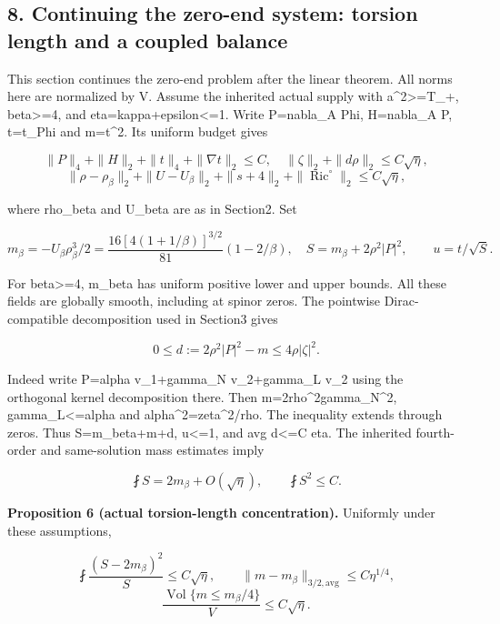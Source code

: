\documentclass[
  10pt,
]{article}
\begin{document}
\hypertarget{continuing-the-zero-end-system-torsion-length-and-a-coupled-balance}{%
\subsection{8. Continuing the zero-end system: torsion length and a
coupled
balance}\label{continuing-the-zero-end-system-torsion-length-and-a-coupled-balance}}

This section continues the zero-end problem after the linear theorem.
All norms here are normalized by V. Assume the inherited actual supply
with a\^{}2\textgreater=T\_+, beta\textgreater=4, and
eta=kappa+epsilon\textless=1. Write P=nabla\_A Phi, H=nabla\_A P,
t=t\_Phi and m=\textbar t\textbar\^{}2. Its uniform budget gives

\[
 \|P\|_4+\|H\|_2+\|t\|_4+\|\nabla t\|_2\le C,\quad
 \|\zeta\|_2+\|d\rho\|_2\le C\sqrt\eta,
\] \[
 \|\rho-\rho_\beta\|_2+\|U-U_\beta\|_2
 +\|s+4\|_2+\|\operatorname{Ric}^{\circ}\|_2\le C\sqrt\eta,
\]

where rho\_beta and U\_beta are as in Section2. Set

\[
 m_\beta=-U_\beta\rho_\beta^3/2
 =\frac{16[4(1+1/\beta)]^{3/2}}{81}(1-2/\beta),\quad
 S=m_\beta+2\rho^2|P|^2,\qquad u=t/\sqrt S.            \tag{8.1}
\]

For beta\textgreater=4, m\_beta has uniform positive lower and upper
bounds. All these fields are globally smooth, including at spinor zeros.
The pointwise Dirac-compatible decomposition used in Section3 gives

\[
       0\le d:=2\rho^2|P|^2-m\le4\rho|\zeta|^2.      \tag{8.2}
\]

Indeed write P=alpha v\_1+gamma\_N v\_2+gamma\_L v\_2 using the
orthogonal kernel decomposition there. Then
m=2rho\^{}2\textbar gamma\_N\textbar\^{}2,
\textbar gamma\_L\textbar\textless=\textbar alpha\textbar{} and
\textbar alpha\textbar\^{}2=\textbar zeta\textbar\^{}2/rho. The
inequality extends through zeros. Thus S=m\_beta+m+d,
\textbar u\textbar\textless=1, and avg d\textless=C eta. The inherited
fourth-order and same-solution mass estimates imply

\[
 \fint S=2m_\beta+O(\sqrt\eta),\qquad \fint S^2\le C. \tag{8.3}
\]

\textbf{Proposition 6 (actual torsion-length concentration).} Uniformly
under these assumptions,

\[
 \fint\frac{(S-2m_\beta)^2}{S}\le C\sqrt\eta,\qquad
 \|m-m_\beta\|_{3/2,\mathrm{avg}}\le C\eta^{1/4},
                                                               \tag{8.4}
\] \[
 \frac{\operatorname{Vol}\{m\le m_\beta/4\}}V
                                      \le C\sqrt\eta. \tag{8.5}
\]
\end{document}
